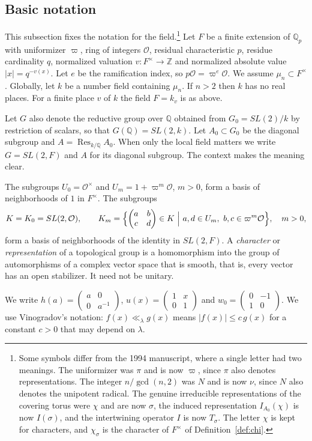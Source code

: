 \documentclass[12pt,letterpaper]{article}
\numberwithin{equation}{section}
\theoremstyle{definition}
\newcommand{\Z}{\mathbb Z}
\newcommand{\Q}{\mathbb Q}
\newcommand{\OF}{\mathcal O}
\newcommand{\vp}{\varpi}
\DeclareMathOperator{\Res}{Res}
\begin{document}
\subsection{Basic notation}\label{subsec:basic}
This subsection fixes the notation for the field.\footnote{Some symbols differ from the 1994
manuscript, where a single letter had two meanings.  The uniformizer was $\pi$ and is now
$\vp$, since $\pi$ also denotes representations.  The integer $n/\gcd(n,2)$ was $N$ and is
now $\nu$, since $N$ also denotes the unipotent radical.  The genuine irreducible
representations of the covering torus were $\chi$ and are now $\sigma$, the induced
representation $I_{A_0}(\chi)$ is now $I(\sigma)$, and the intertwining operator $I$ is now
$T_\sigma$.  The letter $\chi$ is kept for characters, and $\chi_\sigma$ is the character of
$F^\times$ of Definition~\ref{def:chi}.}
Let $F$ be a finite extension of $\Q_p$
with uniformizer $\vp$, ring of integers $\OF$, residual characteristic $p$, residue
cardinality $q$, normalized valuation $v:F^\times\to\Z$ and normalized absolute value
$|x|=q^{-v(x)}$.  Let $e$ be the ramification index, so $p\OF=\vp^e\OF$.  We assume
$\mu_n\subset F^\times$.  Globally, let $k$ be a number field containing $\mu_n$.  If
$n>2$ then $k$ has no real places.  For a finite place $v$ of $k$ the field $F=k_v$ is as
above.

Let $G$ also denote the reductive group over $\Q$ obtained from $G_0=SL(2)/k$ by restriction
of scalars, so that $G(\Q)=SL(2,k)$.  Let $A_0\subset G_0$ be the diagonal subgroup and
$A=\Res_{k/\Q}A_0$.  When only the local field matters we write $G=SL(2,F)$ and $A$ for
its diagonal subgroup.  The context makes the meaning clear.

The subgroups $U_0=\OF^\times$ and $U_m=1+\vp^m\OF$, $m>0$, form a basis of neighborhoods of
$1$ in $F^\times$.  The subgroups
\[
K=K_0=SL(2,\OF),\qquad
K_m=\Bigl\{\begin{pmatrix}a&b\\c&d\end{pmatrix}\in K\ \Big|\ a,d\in U_m,\ b,c\in\vp^m\OF\Bigr\},
\quad m>0,
\]
form a basis of neighborhoods of the identity in $SL(2,F)$.  A \emph{character} or
\emph{representation} of a topological group is a homomorphism into the group of
automorphisms of a complex vector space that is smooth, that is, every vector has an open
stabilizer.  It need not be unitary.

We write $h(a)=\begin{pmatrix}a&0\\0&a^{-1}\end{pmatrix}$,
$u(x)=\begin{pmatrix}1&x\\0&1\end{pmatrix}$ and
$w_0=\begin{pmatrix}0&-1\\1&0\end{pmatrix}$.  We use Vinogradov's notation:
$f(x)\ll_\lambda g(x)$ means $|f(x)|\le c\,g(x)$ for a constant $c>0$ that may depend on
$\lambda$.
\end{document}
